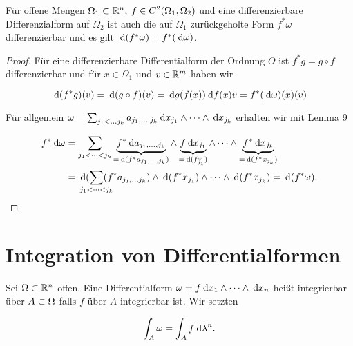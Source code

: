 \documentclass[skript.tex]{subfiles}
\begin{document}
	
	\begin{theorem}
		Für offene Mengen $\Omega_1 \subset {\mathbb{R}^n}, \: f \in C^2 (\Omega_1,\Omega_2)$ und eine differenzierbare Differenzialform auf $\Omega_2$ ist auch die auf $\Omega_1$ zurückgeholte Form $f^*\omega$ differenzierbar und es gilt $\: \mathrm{d}( f^* \omega) = f^*(\: \mathrm{d} \omega)$.
	\end{theorem}

	\begin{proof}
		Für eine differenzierbare Differentialform der Ordnung $O$ ist $f^*g = g \circ f$ differenzierbar und für $x \in \Omega_1$ und $v \in \mathbb{R}^m$ haben wir
		
		\begin{equation*}
		\: \mathrm{d}(f^*g)(v)= \: \mathrm{d}(g \circ f)(v)= \: \mathrm{d} g (f(x)) \: \mathrm{d} f(x)v = f^*(\: \mathrm{d} \omega)(x)(v)
		\end{equation*}
		
		Für allgemein $\omega = \sum_{j_1 < \dots j_k} a_{j_1, \dots,j_k} \: \mathrm{d} x_{j_1} \wedge \dots \wedge \: \mathrm{d} x_{j_k}$ erhalten wir mit Lemma 9
		
		\begin{align*}
		f^*\md \omega &= \sum_{j_1 < \dots < j_k} \underbrace{f^* \md a_{j_1, \dots, j_k}}_{=\md (f^*a_{j_1, \dots, j_k})} \wedge \underbrace{f \md x_{j_1}}_{= \md (f^ x_{j_1})} \wedge \dots \wedge \underbrace{f^* \md x_{j_k}}_{= \md (f^* x_{j_k})}\\
		 &= \md ( \sum _{\mathclap{j_1 < \dots < j_k}} (f^*a_{j_1, \dots j_k}) \wedge \md(f^* x_{j_1}) \wedge \dots \wedge \md (f^* x_{j_k}) = \md( f^* \omega).
		\end{align*}
		
	\end{proof}
		
		\section{Integration von Differentialformen}
		\begin{defin}
			Sei $\Omega \subset {\mathbb{R}^n}$ offen. Eine Differentialform $\omega = f \: \mathrm{d} x_1 \wedge \dots \wedge \: \mathrm{d} x_n$ heißt integrierbar über $A \subset \Omega$ falls $f$ über $A$ integrierbar ist. Wir setzten 
			
			\begin{equation*}
			\int_A \omega = \int_A f \: \mathrm{d} \lambda^n.
			\end{equation*}
		\end{defin}
	
\end{document}
